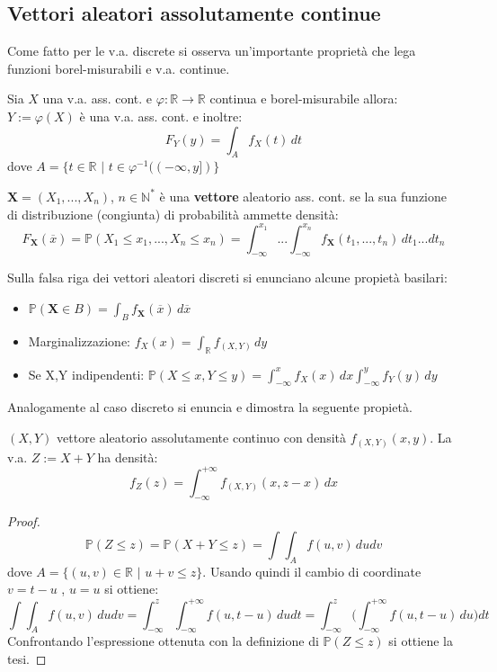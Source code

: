 \subsection{Vettori aleatori assolutamente continue}

Come fatto per le v.a. discrete si osserva un'importante proprietà che lega funzioni borel-misurabili e v.a. continue.

\begin{proposition}
Sia $X$ una v.a. ass. cont. e $\varphi:\mathbb{R}\longrightarrow\mathbb{R}$ continua e borel-misurabile allora: $Y:=\varphi(X)$ è una v.a. ass. cont. e inoltre:
\[F_Y(y)=\int_A f_X(t) \,dt\] dove $A=\{t\in\mathbb{R}$ $|$ $t\in\varphi^{-1}((-\infty,y])\}$
\end{proposition}


\begin{definition}
$\textbf{X}=(X_1,...,X_n)$, $n\in\mathbb{N}^*$ è una \textbf{vettore} aleatorio ass. cont. se la sua funzione di distribuzione (congiunta) di probabilità ammette densità:
\[F_\textbf{X}(\overline{x})=\mathbb{P}(X_1\leq x_1,...,X_n\leq x_n)=\int_{-\infty}^{x_1}...\int_{-\infty}^{x_n} f_\textbf{X}(t_1,...,t_n) \,dt_1...dt_n\]
\end{definition}

\vspace{10px}

Sulla falsa riga dei vettori aleatori discreti si enunciano alcune propietà basilari:
\begin{itemize}
    \item $\mathbb{P}(\textbf{X}\in B)=\int_B f_{\textbf{X}}(\overline{x}) \,d\overline{x}$
    \item Marginalizzazione: $f_X(x)=\int_{\mathbb{R}} f_{(X,Y)} \,dy$
    \item Se X,Y indipendenti: $\mathbb{P}(X\leq x,Y\leq y)=\int_{-\infty}^x f_X(x) \,dx\int_{-\infty}^y f_Y(y) \,dy$
\end{itemize}

\vspace{10px}

Analogamente al caso discreto si enuncia e dimostra la seguente propietà.

\begin{proposition}
$(X,Y)$ vettore aleatorio assolutamente continuo con densità $f_{(X,Y)}(x,y)$. La v.a. $Z:=X+Y$ ha densità: \[ f_Z(z) = \int_{-\infty}^{+\infty} f_{(X,Y)}(x,z-x) \, dx \] 
\vspace{5px}
\begin{proof}
\[\mathbb{P}(Z\leq z)=\mathbb{P}(X+Y\leq z)=\int\int_A f(u,v) \, dudv\] 
\vspace{5px}
\newline
dove $A=\{(u,v)\in\mathbb{R}$ $|$ $u+v \leq z\}$. Usando quindi il cambio di coordinate $v=t-u$ , $u=u$ si ottiene:
\[\int\int_A f(u,v) \, dudv = \int_{-\infty}^z\int_{-\infty}^{+\infty} f(u,t-u) \,dudt = \int_{-\infty}^{z}\bigg(\int_{-\infty}^{+\infty} f(u,t-u) \,du\bigg)dt\]
Confrontando l'espressione ottenuta con la definizione di $\mathbb{P}(Z\leq z)$ si ottiene la tesi.
\end{proof}
\end{proposition}


